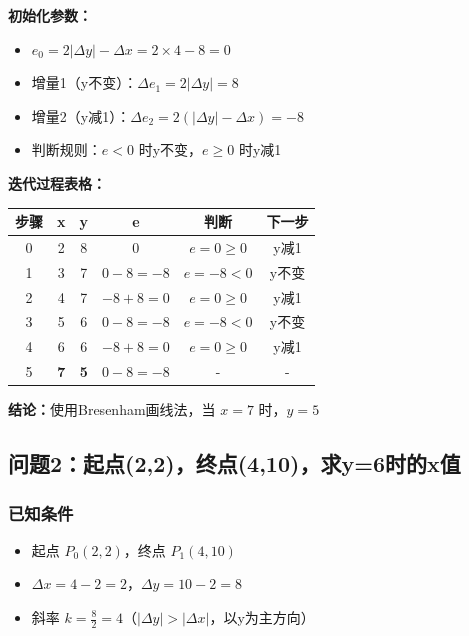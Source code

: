 \documentclass[12pt,a4paper]{article}
\begin{document}
\begin{tcolorbox}
\textbf{初始化参数：}
\begin{itemize}
    \item $e_0 = 2|\Delta y| - \Delta x = 2 \times 4 - 8 = 0$
    \item 增量1（y不变）：$\Delta e_1 = 2|\Delta y| = 8$
    \item 增量2（y减1）：$\Delta e_2 = 2(|\Delta y| - \Delta x) = -8$
    \item 判断规则：$e < 0$ 时y不变，$e \geq 0$ 时y减1
\end{itemize}

\textbf{迭代过程表格：}

\begin{center}
\begin{tabular}{|c|c|c|c|c|c|}
\hline
\textbf{步骤} & \textbf{x} & \textbf{y} & \textbf{e} & \textbf{判断} & \textbf{下一步} \\
\hline
0 & 2 & 8 & 0 & $e=0 \geq 0$ & y减1 \\
\hline
1 & 3 & 7 & $0-8=-8$ & $e=-8<0$ & y不变 \\
\hline
2 & 4 & 7 & $-8+8=0$ & $e=0 \geq 0$ & y减1 \\
\hline
3 & 5 & 6 & $0-8=-8$ & $e=-8<0$ & y不变 \\
\hline
4 & 6 & 6 & $-8+8=0$ & $e=0 \geq 0$ & y减1 \\
\hline
5 & \textbf{7} & \textbf{5} & $0-8=-8$ & - & - \\
\hline
\end{tabular}
\end{center}

\textbf{结论：}使用Bresenham画线法，当 $x = 7$ 时，$\boxed{y = 5}$
\end{tcolorbox}

\subsection{问题2：起点(2,2)，终点(4,10)，求y=6时的x值}

\subsubsection{已知条件}

\begin{tcolorbox}
\begin{itemize}
    \item 起点 $P_0(2, 2)$，终点 $P_1(4, 10)$
    \item $\Delta x = 4 - 2 = 2$，$\Delta y = 10 - 2 = 8$
    \item 斜率 $k = \frac{8}{2} = 4$（$|\Delta y| > |\Delta x|$，以y为主方向）
\end{itemize}
\end{tcolorbox}
\end{document}

